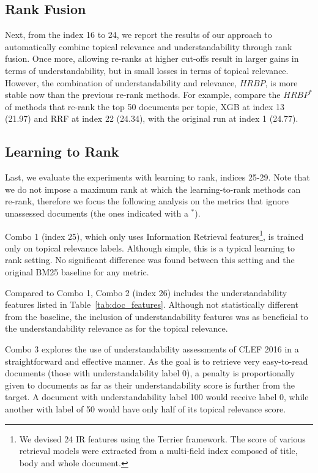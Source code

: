 \subsection{Rank Fusion}
\label{results:fusion}

Next, from the index 16 to 24, we report the results of our approach to automatically combine topical relevance and understandability through rank fusion.
Once more, allowing re-ranks at higher cut-offs result in larger gains in terms of understandability, but in small losses in terms of topical relevance.
However, the combination of understandability and relevance, $HRBP$, is more stable now than the previous re-rank methods. 
For example, compare the $HRBP^*$ of methods that re-rank the top 50 documents per topic, XGB at index 13 (21.97) and RRF at index 22 (24.34), with the original run at index 1 (24.77).

\subsection{Learning to Rank}
\label{results:ltr}

Last, we evaluate the experiments with learning to rank, indices 25-29. Note that we do not impose a maximum rank at which the learning-to-rank methods can re-rank, therefore we focus the following analysis on the metrics that ignore unassessed documents (the ones indicated with a $^*$).

Combo 1 (index 25), which only uses Information Retrieval features\footnote{We devised 24 IR features using the Terrier framework. The score of various retrieval models were extracted from a multi-field index composed of title, body and whole document.}, is trained only on topical relevance labels. Although simple, this is a typical learning to rank setting.
No significant difference was found between this setting and the original BM25 baseline for any metric.

Compared to Combo 1, Combo 2 (index 26) includes the understandability features listed in Table~\ref{tab:doc_features}. Although not statistically different from the baseline, the inclusion of understandability features was as beneficial to the understandability relevance as for the topical relevance.

Combo 3 explores the use of understandability assessments of CLEF 2016 in a straightforward and effective manner. As the goal is to retrieve very easy-to-read documents (those with understandability label 0), a penalty is proportionally given to documents as far as their understandability score is further from the target. A document with understandability label 100 would receive label 0, while another with label of 50 would have only half of its topical relevance score.

